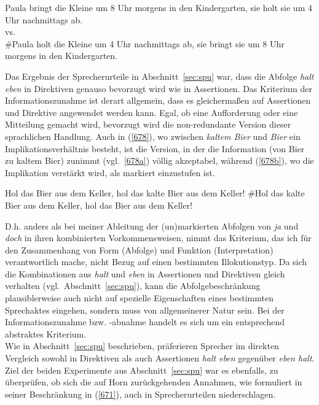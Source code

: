 \begin{exe}
	\ex\label{677} 
	Paula bringt die Kleine um 8 Uhr morgens in den Kindergarten, sie holt sie um 4 Uhr nachmittags ab.\\
	vs.\\
	\#Paula holt die Kleine um 4 Uhr nachmittags ab, sie bringt sie um 8 Uhr morgens in den Kindergarten.
\end{exe}
Das Ergebnis der Sprecherurteile in Abschnitt~\ref{sec:spu} war, dass die Abfolge \textit{halt eben} in Direktiven genauso bevorzugt wird wie in Assertionen. Das Kriterium der Informationszunahme ist derart allgemein, dass es gleichermaßen auf Assertionen und Direktive angewendet werden kann. Egal, ob eine Aufforderung oder eine Mitteilung gemacht wird, bevorzugt wird die non-redundante Version dieser sprachlichen Handlung. Auch in (\ref{678}), wo zwischen \textit{kaltem Bier} und \textit{Bier} ein Implikationsverhältnis besteht, ist die Version, in der die Information (von Bier zu kaltem Bier) zunimmt (vgl.\ \ref{678a}) völlig akzeptabel, während (\ref{678b}), wo die Implikation verstärkt wird, als markiert einzustufen ist.
	
\begin{exe}
	\ex\label{678} 
		\begin{xlist}	
			\ex\label{678a} Hol das Bier aus dem Keller, hol das kalte Bier aus dem Keller!
			\ex\label{678b} \#Hol das kalte Bier aus dem Keller, hol das Bier aus dem Keller!
		\end{xlist}
\end{exe}
D.h. anders als bei meiner Ableitung der (un)markierten Abfolgen von \textit{ja} und \textit{doch} in ihren kombinierten Vorkommensweisen, nimmt das Kriterium, das ich für den Zusammenhang  von Form (Abfolge) und Funktion (Interpretation) verantwortlich mache, nicht Bezug auf einen bestimmten Illokutionstyp. Da sich die Kombinationen aus \textit{halt} und \textit{eben} in Assertionen und Direktiven gleich verhalten (vgl.\ Abschnitt~\ref{sec:spu}), kann die Abfolgebeschränkung plausiblerweise auch nicht auf spezielle Eigenschaften eines bestimmten Sprechaktes eingehen, sondern muss von allgemeinerer Natur sein. Bei der Informationszunahme bzw. -abnahme  handelt es sich um ein entsprechend abstraktes Kriterium.\\

\noindent
Wie in Abschnitt~\ref{sec:spu} beschrieben, präferieren Sprecher im direkten Vergleich sowohl in Direktiven als auch Assertionen \textit{halt eben} gegenüber \textit{eben halt}. Ziel der beiden Experimente aus Abschnitt~\ref{sec:spu} war es ebenfalls, zu überprüfen, ob sich die auf Horn zurückgehenden Annahmen, wie formuliert in seiner Beschränkung in (\ref{671}), auch in Sprecherurteilen niederschlagen. 

